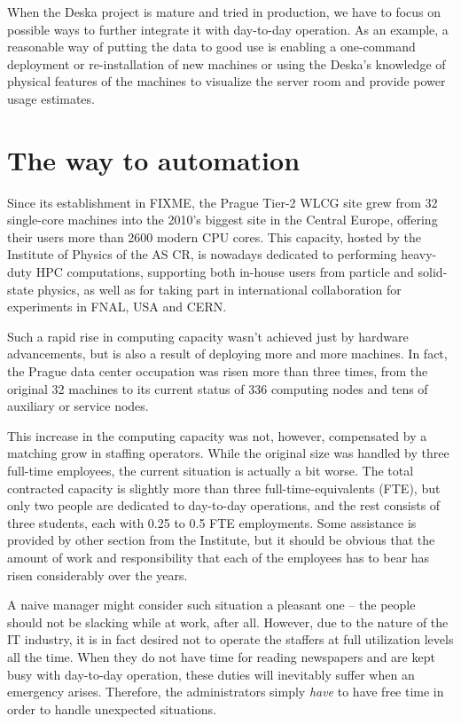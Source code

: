 \documentclass[11pt]{article}
\begin{document}
When the Deska project is mature and tried in production, we have to focus on
possible ways to further integrate it with day-to-day operation.  As an example,
a reasonable way of putting the data to good use is enabling a one-command
deployment or re-installation of new machines or using the Deska's knowledge of
physical features of the machines to visualize the server room and provide power
usage estimates.


\section{The way to automation}

Since its establishment in FIXME, the Prague Tier-2 WLCG site grew from 32
single-core machines into the 2010's biggest site in the Central Europe,
offering their users more than 2600 modern CPU cores.  This capacity, hosted by
the Institute of Physics of the AS CR, is nowadays dedicated to performing
heavy-duty HPC computations, supporting both in-house users from particle and
solid-state physics, as well as for taking part in international collaboration
for experiments in FNAL, USA and CERN.

Such a rapid rise in computing capacity wasn't achieved just by hardware
advancements, but is also a result of deploying more and more machines. In fact,
the Prague data center occupation was risen more than three times, from the
original 32 machines to its current status of 336 computing nodes and tens of
auxiliary or service nodes.

This increase in the computing capacity was not, however, compensated by a
matching grow in staffing operators.  While the original size was handled by
three full-time employees, the current situation is actually a bit worse.  The
total contracted capacity is slightly more than three full-time-equivalents
(FTE), but only two people are dedicated to day-to-day operations, and the rest
consists of three students, each with 0.25 to 0.5 FTE employments.  Some
assistance is provided by other section from the Institute, but it should be
obvious that the amount of work and responsibility that each of the employees
has to bear has risen considerably over the years.

A naive manager might consider such situation a pleasant one -- the people
should not be slacking while at work, after all.  However, due to the nature of
the IT industry, it is in fact desired not to operate the staffers at full
utilization levels all the time.  When they do not have time for reading
newspapers and are kept busy with day-to-day operation, these duties will
inevitably suffer when an emergency arises.  Therefore, the administrators
simply {\em have} to have free time in order to handle unexpected situations.
\end{document}
